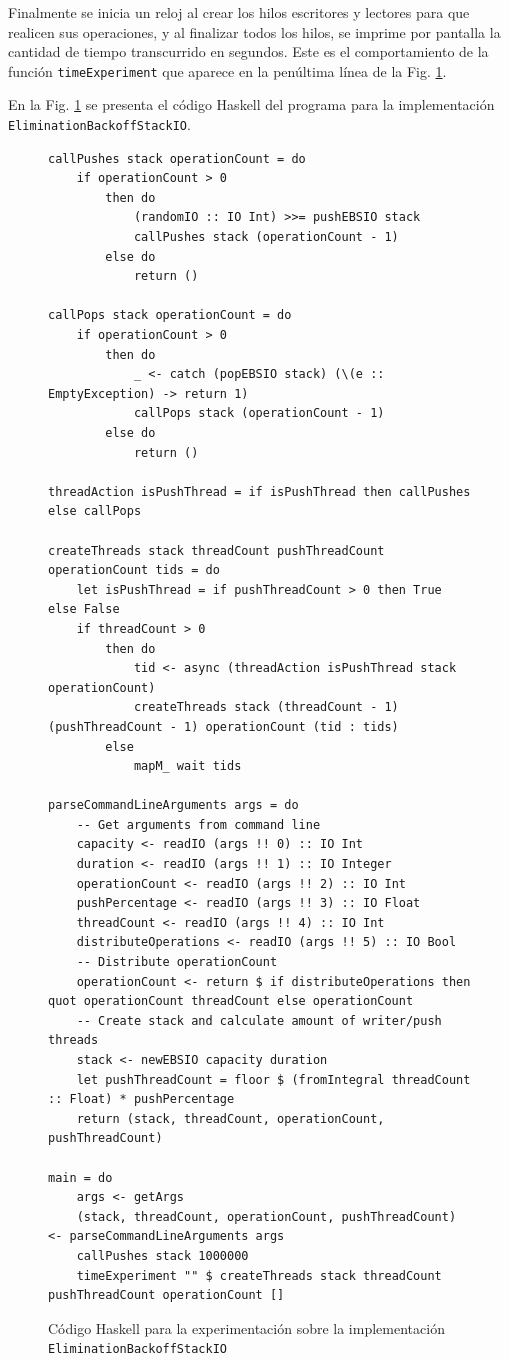 Finalmente se inicia un reloj al crear los hilos escritores y lectores para que realicen sus operaciones, y al finalizar todos los hilos, se imprime por pantalla la cantidad de tiempo transcurrido en segundos. Este es el comportamiento de la función \texttt{timeExperiment} que aparece en la penúltima línea de la Fig. \ref{fig:expEBSIO}.

En la Fig. \ref{fig:expEBSIO} se presenta el código Haskell del programa para la implementación \texttt{EliminationBackoffStackIO}.

\begin{figure}[t]
    \centering
    \begin{verbatim}
callPushes stack operationCount = do
    if operationCount > 0
        then do
            (randomIO :: IO Int) >>= pushEBSIO stack
            callPushes stack (operationCount - 1)
        else do
            return ()

callPops stack operationCount = do
    if operationCount > 0
        then do
            _ <- catch (popEBSIO stack) (\(e :: EmptyException) -> return 1)
            callPops stack (operationCount - 1)
        else do
            return ()

threadAction isPushThread = if isPushThread then callPushes else callPops

createThreads stack threadCount pushThreadCount operationCount tids = do
    let isPushThread = if pushThreadCount > 0 then True else False
    if threadCount > 0
        then do
            tid <- async (threadAction isPushThread stack operationCount)
            createThreads stack (threadCount - 1) (pushThreadCount - 1) operationCount (tid : tids)
        else
            mapM_ wait tids

parseCommandLineArguments args = do
    -- Get arguments from command line
    capacity <- readIO (args !! 0) :: IO Int
    duration <- readIO (args !! 1) :: IO Integer
    operationCount <- readIO (args !! 2) :: IO Int
    pushPercentage <- readIO (args !! 3) :: IO Float
    threadCount <- readIO (args !! 4) :: IO Int
    distributeOperations <- readIO (args !! 5) :: IO Bool
    -- Distribute operationCount
    operationCount <- return $ if distributeOperations then quot operationCount threadCount else operationCount
    -- Create stack and calculate amount of writer/push threads
    stack <- newEBSIO capacity duration
    let pushThreadCount = floor $ (fromIntegral threadCount :: Float) * pushPercentage
    return (stack, threadCount, operationCount, pushThreadCount)

main = do
    args <- getArgs
    (stack, threadCount, operationCount, pushThreadCount) <- parseCommandLineArguments args
    callPushes stack 1000000
    timeExperiment "" $ createThreads stack threadCount pushThreadCount operationCount []
    \end{verbatim}
    \caption{Código Haskell para la experimentación sobre la implementación \texttt{EliminationBackoffStackIO}}
    \label{fig:expEBSIO}
\end{figure}

